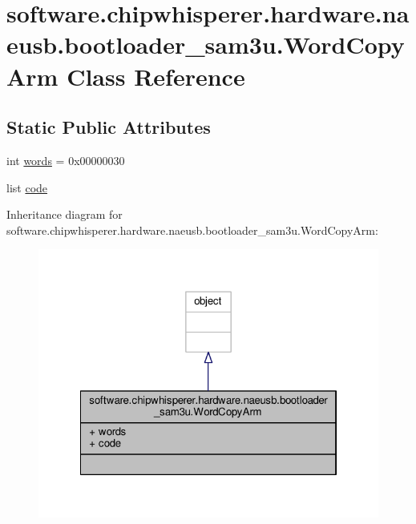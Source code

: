 \hypertarget{classsoftware_1_1chipwhisperer_1_1hardware_1_1naeusb_1_1bootloader__sam3u_1_1WordCopyArm}{}\section{software.\+chipwhisperer.\+hardware.\+naeusb.\+bootloader\+\_\+sam3u.\+Word\+Copy\+Arm Class Reference}
\label{classsoftware_1_1chipwhisperer_1_1hardware_1_1naeusb_1_1bootloader__sam3u_1_1WordCopyArm}
\subsection*{Static Public Attributes}
\begin{DoxyCompactItemize}
\item 
int \hyperlink{classsoftware_1_1chipwhisperer_1_1hardware_1_1naeusb_1_1bootloader__sam3u_1_1WordCopyArm_aaebc809a2fc643e3bcc1ebb5644515a2}{words} = 0x00000030
\item 
list \hyperlink{classsoftware_1_1chipwhisperer_1_1hardware_1_1naeusb_1_1bootloader__sam3u_1_1WordCopyArm_a8b1b16bf9a66da7029d763029e4b88db}{code}
\end{DoxyCompactItemize}


Inheritance diagram for software.\+chipwhisperer.\+hardware.\+naeusb.\+bootloader\+\_\+sam3u.\+Word\+Copy\+Arm\+:\nopagebreak
\begin{figure}[H]
\begin{center}
\leavevmode
\includegraphics[width=322pt]{d7/d0f/classsoftware_1_1chipwhisperer_1_1hardware_1_1naeusb_1_1bootloader__sam3u_1_1WordCopyArm__inherit__graph}
\end{center}
\end{figure}


